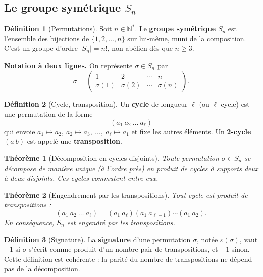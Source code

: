 \documentclass[12pt,a4paper]{report}
\newtheorem{theoreme}{Théorème}[section]
\theoremstyle{definition}
\newtheorem{definition}{Définition}[section]
\theoremstyle{remark}
\begin{document}
\subsection{Le groupe symétrique $S_n$}

\begin{definition}[Permutations]
Soit $n \in \mathbb{N}^*$. Le \textbf{groupe symétrique} $S_n$ est l'ensemble des bijections de $\{1, 2, \dots, n\}$ sur lui-même, muni de la composition. C'est un groupe d'ordre $|S_n| = n!$, non abélien dès que $n \ge 3$.
\end{definition}

\medskip

\noindent\textbf{Notation à deux lignes.} On représente $\sigma \in S_n$ par
\[ \sigma = \begin{pmatrix} 1 & 2 & \cdots & n \\ \sigma(1) & \sigma(2) & \cdots & \sigma(n) \end{pmatrix}. \]

\begin{definition}[Cycle, transposition]
Un \textbf{cycle} de longueur $\ell$ (ou $\ell$-cycle) est une permutation de la forme
\[ (a_1\ a_2\ \dots\ a_\ell) \]
qui envoie $a_1 \mapsto a_2,\ a_2 \mapsto a_3,\ \dots,\ a_\ell \mapsto a_1$ et fixe les autres éléments.
Un \textbf{2-cycle} $(a\ b)$ est appelé une \textbf{transposition}.
\end{definition}

\begin{theoreme}[Décomposition en cycles disjoints]
Toute permutation $\sigma \in S_n$ se décompose de manière unique (à l'ordre près) en produit de cycles à supports deux à deux disjoints. Ces cycles commutent entre eux.
\end{theoreme}

\begin{theoreme}[Engendrement par les transpositions]
Tout cycle est produit de transpositions :
\[ (a_1\ a_2\ \dots\ a_\ell) = (a_1\ a_\ell)(a_1\ a_{\ell-1}) \cdots (a_1\ a_2). \]
En conséquence, $S_n$ est engendré par les transpositions.
\end{theoreme}

\begin{definition}[Signature]
La \textbf{signature} d'une permutation $\sigma$, notée $\varepsilon(\sigma)$, vaut $+1$ si $\sigma$ s'écrit comme produit d'un nombre pair de transpositions, et $-1$ sinon. Cette définition est cohérente : la parité du nombre de transpositions ne dépend pas de la décomposition.
\end{definition}
\end{document}
